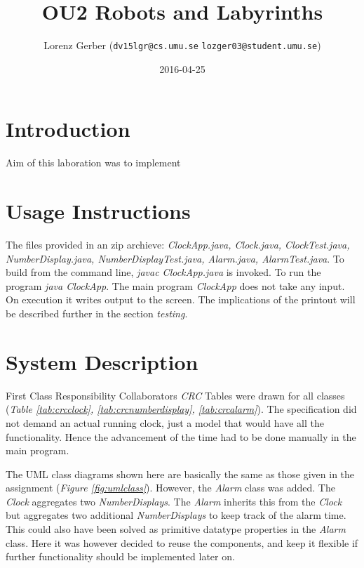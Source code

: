 \documentclass[a4paper,11pt,twoside]{article}
\title{OU2 Robots and Labyrinths}
\author{Lorenz Gerber ({\tt{dv15lgr@cs.umu.se}} {\tt{lozger03@student.umu.se}})}
\date{2016-04-25}
\begin{document}
\lstset{language=C}
\maketitle
\thispagestyle{empty}
\newpage

\clearpage
{}

\section{Introduction} 
Aim of this laboration was to implement 


\section{Usage Instructions}
The files provided in an zip archieve: \textit{ClockApp.java,
  Clock.java, ClockTest.java, NumberDisplay.java,
  NumberDisplayTest.java, Alarm.java, AlarmTest.java}. To build from
the command line, \textit{javac ClockApp.java} is invoked. To run the
program \textit{java ClockApp}. The main program \textit{ClockApp}
does not take any input. On execution it writes output to the
screen. The implications of the printout will be described further in
the section \textit{testing}. 

\section{System Description}
First Class Responsibility Collaborators \textit{CRC} Tables were
drawn for all classes (\textit{Table \ref{tab:crcclock},
\ref{tab:crcnumberdisplay}, \ref{tab:crcalarm}}). The specification
did not demand an actual running clock, just a model that would have
all the functionality. Hence the advancement of the time had to be
done manually in the main program.

The UML class diagrams shown here are basically the same as those
given in the assignment (\textit{Figure \ref{fig:umlclass}}). However,
the \textit{Alarm} class was added. The \textit{Clock} aggregates two
\textit{NumberDisplays}. The \textit{Alarm} inherits this from the
\textit{Clock} but aggregates two additional \textit{NumberDisplays}
to keep track of the alarm time. This could also have been solved as
primitive datatype properties in the \textit{Alarm} class. Here it was
however decided to reuse the components, and keep it flexible if
further functionality should be implemented later on.
\end{document}
